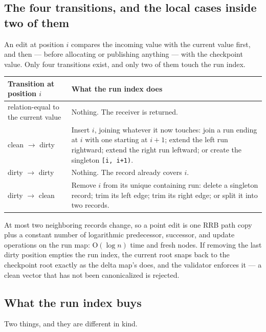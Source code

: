 \documentclass[11pt,twoside,openright]{book}
\makeatletter
\newcommand{\code}[1]{\texorpdfstring{\textcolor{d7ink}{\texttt{#1}}}{#1}}
\newcommand{\bigoh}[1]{$\mathrm{O}(#1)$}
\newenvironment{d7table}[1]
  {\par\vspace{3pt}\small
   \setlength{\LTpre}{4pt}\setlength{\LTpost}{4pt}
   \begin{longtable}{@{}%
     >{\raggedright\arraybackslash}p{#1\textwidth}%
     @{\hspace{10pt}}%
     >{\raggedright\arraybackslash}p{\dimexpr\textwidth-#1\textwidth-10pt\relax}@{}}}
  {\end{longtable}}
\newcommand{\thead}[1]{\sffamily\bfseries\footnotesize\color{d7ink}#1}
\makeatother
\begin{document}
\subsection{The four transitions, and the local cases inside two of them}

An edit at position $i$ compares the incoming value with the current value
first, and then --- before allocating or publishing anything --- with the
checkpoint value. Only four transitions exist, and only two of them touch the
run index.

\begin{d7table}{0.31}
\toprule
\thead{Transition at position $i$} & \thead{What the run index does} \\
\midrule
relation-equal to the current value & Nothing. The receiver is returned. \\
clean $\to$ dirty & Insert $i$, joining whatever it now touches: join a run
ending at $i$ with one starting at $i+1$; extend the left run rightward; extend
the right run leftward; or create the singleton \code{[i, i+1)}. \\
dirty $\to$ dirty & Nothing. The record already covers $i$. \\
dirty $\to$ clean & Remove $i$ from its unique containing run: delete a
singleton record; trim its left edge; trim its right edge; or split it into two
records. \\
\bottomrule
\end{d7table}

\noindent
At most two neighboring records change, so a point edit is one RRB path copy
plus a constant number of logarithmic predecessor, successor, and update
operations on the run map: \bigoh{\log n} time and fresh nodes. If removing the
last dirty position empties the run index, the current root snaps back to the
checkpoint root exactly as the delta map's does, and the validator enforces it
--- a clean vector that has not been canonicalized is rejected.

\subsection{What the run index buys}

Two things, and they are different in kind.
\end{document}
